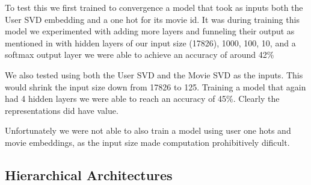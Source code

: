 To test this we first trained to convergence a model that took as inputs both the User SVD embedding and a one hot for its movie id. It was during training this model we experimented with adding more layers and funneling their output as mentioned in \cite{He2017} with hidden layers of our input size (17826), 1000, 100, 10, and a softmax output layer we were able to achieve an accuracy of around 42\%

We also tested using both the User SVD and the Movie SVD as the inputs. This would shrink the input size down from 17826 to 125. Training a model that again had 4 hidden layers we were able to reach an accuracy of 45\%. Clearly the representations did have value.

Unfortunately we were not able to also train a model using user one hots and movie embeddings, as the input size made computation prohibitively dificult. 
\subsection{Hierarchical Architectures}
